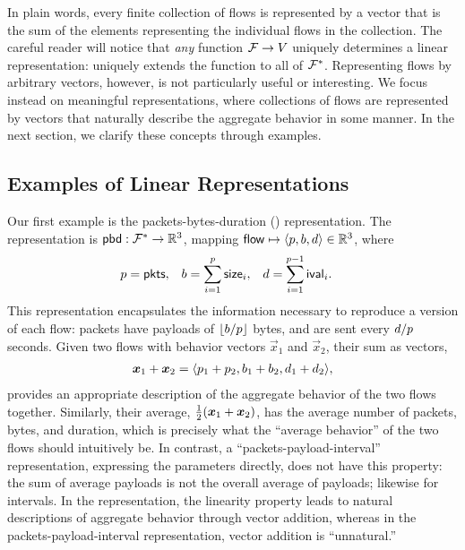 \documentclass[twocolumn,final]{svjour3}
\begin{document}
\noindent
In plain words, every finite collection of flows is represented by a vector that is the sum of the elements representing the individual flows in the collection.
The careful reader will notice that \emph{any} function $\mathcal{F} \to V$ uniquely determines a linear representation:
 uniquely extends the function to all of $\mathcal{F}^*$.
Representing flows by arbitrary vectors, however, is not particularly useful or interesting.
We focus instead on meaningful representations, where collections of flows are represented by vectors that naturally describe the aggregate behavior in some manner.
In the next section, we clarify these concepts through examples.

\subsection{Examples of Linear Representations}


Our first example is the packets-bytes-duration () representation.
The representation is $\text{\textsf{pbd}}: \mathcal{F}^* \to \mathbb{R}^3$, mapping
$\text{\textsf{flow}} \mapsto {\left<p,b,d\right>} \in \mathbb{R}^3$, where
\begin{align}
p &= \pkts, &
b &= \sum_{i=1}^{\mathclap{p}}{\size_i}, &
d &= \sum_{i=1}^{\mathclap{p-1}}{\ival_i}.
\end{align}
This representation encapsulates the information necessary to reproduce a  version of each flow:
packets have payloads of ${\left\lfloor{b/p}\right\rfloor}$ bytes, and are sent every ${d/p}$ seconds.\pbdnote
Given two flows with behavior vectors $\vec{x}_1$ and $\vec{x}_2$, their sum as vectors, 
\begin{align}
\vec{x}_1+\vec{x}_2=\tuple{p_1+p_2,b_1+b_2,d_1+d_2},
\end{align}
provides an appropriate description of the aggregate behavior of the two flows together.
Similarly, their average, $\smallfrac{1}{2}(\vec{x}_1+\vec{x}_2)$, has the average number of packets, bytes, and duration, which is precisely what the ``average behavior'' of the two flows should intuitively be.
In contrast, a ``packets-payload-interval'' representation, expressing the  parameters directly, does not have this property:
the sum of average payloads is not the overall average of payloads;
likewise for intervals.
In the  representation, the linearity property leads to natural descriptions of aggregate behavior through vector addition, whereas in the packets-payload-interval representation, vector addition is ``unnatural.''
\end{document}
